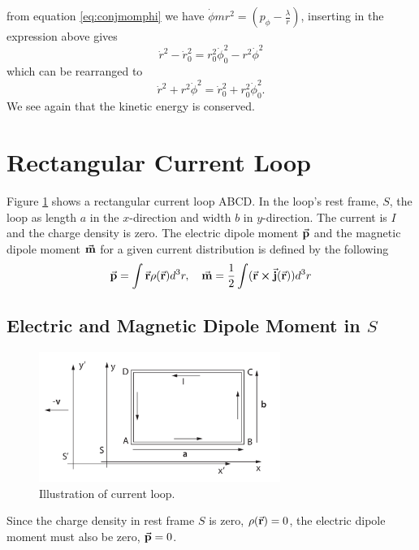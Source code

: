 \documentclass[11pt]{amsart}
\begin{document}
from equation \ref{eq:conjmomphi} we have $\dot{\phi}mr^2 = \left(p_\phi-\frac{\lambda}{r}\right)$, inserting in the expression above gives
\begin{equation*}
\dot{r}^2 - \dot{r}_0^2 = r_0^2\dot{\phi}_0^2 - r^2\dot{\phi}^2
\end{equation*}
which can be rearranged to
\begin{equation}
\dot{r}^2 + r^2\dot{\phi}^2 = \dot{r}_0^2 + r_0^2\dot{\phi}_0^2.
\end{equation}
We see again that the kinetic energy is conserved.

\section{Rectangular Current Loop}
Figure \ref{fig:currentloop} shows a rectangular current loop ABCD. In the loop's rest frame, $S$, the loop as length $a$ in the $x$-direction and width $b$ in $y$-direction. The current is $I$ and the charge density is zero. The electric dipole moment $\va{p}$ and the magnetic dipole moment $\va{m}$ for a given current distribution is defined by the following
\begin{equation}
\va{p} = \int\va{r}\rho(\va{r})d^3r, \quad \va{m} = \frac{1}{2}\int(\va{r}\cp\va{j}(\va{r}))d^3r
\end{equation}

\subsection{Electric and Magnetic Dipole Moment in $S$}

\begin{figure}
	\centering
	\includegraphics[width=0.7\textwidth]{currentloop.png}
	\caption{Illustration of current loop.}
	\label{fig:currentloop}
\end{figure}

Since the charge density in rest frame $S$ is zero, $\rho(\va{r}) = 0$, the electric dipole moment must also be zero, $\va{p} = 0$.
\end{document}
